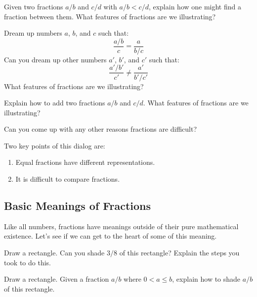 \begin{question} 
Given two fractions $a/b$ and $c/d$ with $a/b < c/d$, explain how one
might find a fraction between them. What features of fractions are we
illustrating?
\end{question}
\QM


\begin{question} 
Dream up numbers $a$, $b$, and $c$ such that:
\[
\frac{a/b}{c} = \frac{a}{b/c}
\]
Can you dream up other numbers $a'$, $b'$, and $c'$ such that:
\[
\frac{a'/b'}{c'} \neq \frac{a'}{b'/c'}
\]
What features of fractions are we illustrating?
\end{question}
\QM

\begin{question}
Explain how to add two fractions $a/b$ and $c/d$. What features of
fractions are we illustrating?
\end{question}
\QM


\begin{question} 
Can you come up with any other reasons fractions are difficult?
\end{question}
\QM

\begin{teachingnote}
Two key points of this dialog are: 
\begin{enumerate}
\item Equal fractions have different representations. 
\item It is difficult to compare fractions. 
\end{enumerate}
\end{teachingnote}






\subsection{Basic Meanings of Fractions}

Like all numbers, fractions have meanings outside of their pure
mathematical existence. Let's see if we can get to the heart of some
of this meaning.

\begin{question}
Draw a rectangle. Can you shade $3/8$ of this rectangle? Explain the
steps you took to do this.
\end{question}
\QM



\begin{question}
Draw a rectangle. Given a fraction $a/b$ where $0< a\le b$, explain how
to shade $a/b$ of this rectangle.
\end{question}
\QM


